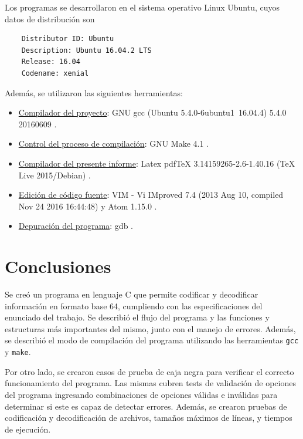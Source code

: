 Los programas se desarrollaron en el sistema operativo Linux Ubuntu, cuyos datos de distribución son
\begin{Verbatim}
	Distributor ID: Ubuntu
	Description: Ubuntu 16.04.2 LTS
	Release: 16.04
	Codename: xenial
\end{Verbatim}

Además, se utilizaron las siguientes herramientas:
\begin{itemize}
	\item \underline{Compilador del proyecto}: GNU gcc (Ubuntu 5.4.0-6ubuntu1~16.04.4) 5.4.0 20160609 \cite{tool_gcc}.
	\item \underline{Control del proceso de compilación}: GNU Make 4.1 \cite{tool_gnuMake}.
	\item \underline{Compilador del presente informe}: Latex pdfTeX 3.14159265-2.6-1.40.16 (TeX Live 2015/Debian) \cite{tool_latex}.
    \item \underline{Edición de código fuente}: VIM - Vi IMproved 7.4 (2013 Aug 10, compiled Nov 24 2016 16:44:48) y Atom 1.15.0 \cite{tool_vim} \cite{tool_atom}.
	\item \underline{Depuración del programa}: gdb \cite{tool_gdb}.
\end{itemize}

\section{Conclusiones}

Se creó un programa en lenguaje C que permite codificar y decodificar información en formato base 64, cumpliendo con las especificaciones del enunciado del trabajo. Se describió el flujo del programa y las funciones y estructuras más importantes del mismo, junto con el manejo de errores. Además, se describió el modo de compilación del programa utilizando las herramientas \texttt{gcc} y \texttt{make}.

Por otro lado, se crearon casos de prueba de caja negra para verificar el correcto funcionamiento del programa. Las mismas cubren tests de validación de opciones del programa ingresando combinaciones de opciones válidas e inválidas para determinar si este es capaz de detectar errores. Además, se crearon pruebas de codificación y decodificación de archivos, tamaños máximos de líneas, y tiempos de ejecución.


